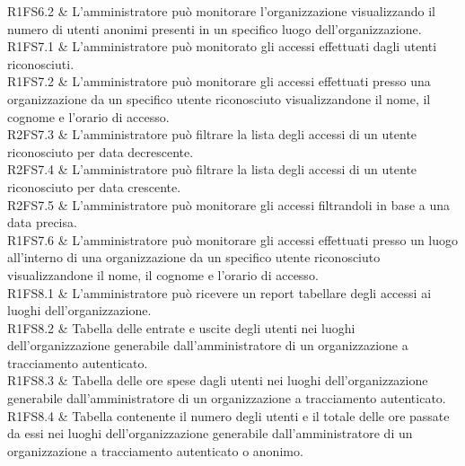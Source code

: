R1FS6.2 & L'amministratore può monitorare l'organizzazione visualizzando il numero di utenti anonimi presenti in un specifico luogo dell'organizzazione. \\

R1FS7.1 & L'amministratore può monitorato gli accessi effettuati dagli utenti riconosciuti. \\

R1FS7.2 & L'amministratore può monitorare gli accessi effettuati presso una organizzazione da un specifico utente riconosciuto visualizzandone il nome, il cognome e l'orario di accesso. \\

R2FS7.3 & L’amministratore può filtrare la lista degli accessi di un utente riconosciuto per data decrescente. \\

R2FS7.4 & L’amministratore può filtrare la lista degli accessi di un utente riconosciuto per data crescente. \\

R2FS7.5 & L'amministratore può monitorare gli accessi filtrandoli in base a una data precisa. \\

R1FS7.6 & L'amministratore può monitorare gli accessi effettuati presso un luogo all'interno di una organizzazione da un specifico utente riconosciuto visualizzandone il nome, il cognome e l'orario di accesso. \\

R1FS8.1 & L'amministratore può ricevere un report tabellare degli accessi ai luoghi dell'organizzazione. \\

R1FS8.2 &  Tabella delle entrate e uscite degli utenti nei luoghi dell'organizzazione generabile dall'amministratore di un organizzazione a tracciamento autenticato. \\

R1FS8.3 & Tabella delle ore spese dagli utenti nei luoghi dell'organizzazione generabile dall'amministratore di un organizzazione a tracciamento autenticato. \\

R1FS8.4 & Tabella contenente il numero degli utenti e il totale delle ore passate da essi nei luoghi dell'organizzazione generabile dall'amministratore di un organizzazione a tracciamento autenticato o anonimo. \\



